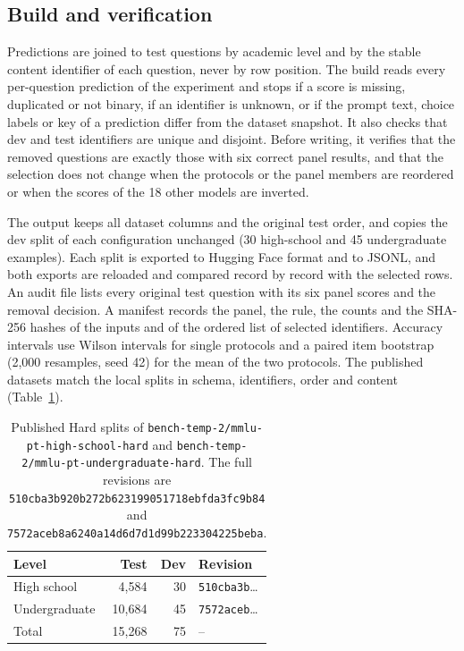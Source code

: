 \subsection{Build and verification}
\label{app:hard-build}

Predictions are joined to test questions by academic level and by the
stable content identifier of each question, never by row position. The
build reads every per-question prediction of the experiment and stops if a
score is missing, duplicated or not binary, if an identifier is unknown, or
if the prompt text, choice labels or key of a prediction differ from the
dataset snapshot. It also checks that dev and test identifiers are unique and
disjoint. Before writing, it verifies that the removed questions are exactly
those with six correct panel results, and that the selection does not
change when the protocols or the panel members are reordered or when the
scores of the 18 other models are inverted.

The output keeps all dataset columns and the original test order, and copies
the dev split of each configuration unchanged (30 high-school and 45
undergraduate examples). Each split is exported to Hugging Face format and to
JSONL, and both exports are reloaded and compared record by record with the
selected rows. An audit file lists every original test question with its six
panel scores and the removal decision. A manifest records the panel, the
rule, the counts and the SHA-256 hashes of the inputs and of the ordered list
of selected identifiers. Accuracy intervals use Wilson intervals for
single protocols and a paired item bootstrap (2,000 resamples, seed 42) for
the mean of the two protocols. The published datasets match the local splits
in schema, identifiers, order and content (Table~\ref{tab:hard-hub}).

\begin{table}[t]
\centering
\footnotesize
\begin{tabular}{@{}lrrl@{}}
\toprule
Level & Test & Dev & Revision \\
\midrule
High school & 4,584 & 30 & \texttt{510cba3b}\ldots \\
Undergraduate & 10,684 & 45 & \texttt{7572aceb}\ldots \\
\midrule
Total & 15,268 & 75 & -- \\
\bottomrule
\end{tabular}
\caption{Published Hard splits of \texttt{bench-temp-2/mmlu-pt-high-school-hard}
and \texttt{bench-temp-2/mmlu-pt-undergraduate-hard}. The full revisions are
\texttt{510cba3b920b272b6231}\allowbreak\texttt{99051718ebfda3fc9b84} and
\texttt{7572aceb8a6240a14d6d}\allowbreak\texttt{7d1d99b223304225beba}.}
\label{tab:hard-hub}
\end{table}

